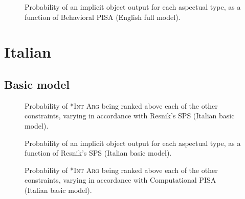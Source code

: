 \begin{figure}[htb]
\caption{Probability of an implicit object output for each aspectual type, as a function of Behavioral PISA (English full model).}
    
\end{figure}




\section{Italian} 

\subsection{Basic model} 


\begin{figure}[htb]
\caption{Probability of \textsc{*Int Arg} being ranked above each of the other constraints, varying in accordance with Resnik's SPS (Italian basic model).}
    
\end{figure}

\begin{figure}[htb]
\caption{Probability of an implicit object output for each aspectual type, as a function of Resnik's SPS (Italian basic model).}
    
\end{figure}



\begin{figure}[htb]
\caption{Probability of \textsc{*Int Arg} being ranked above each of the other constraints, varying in accordance with Computational PISA (Italian basic model).}
    
\end{figure}

